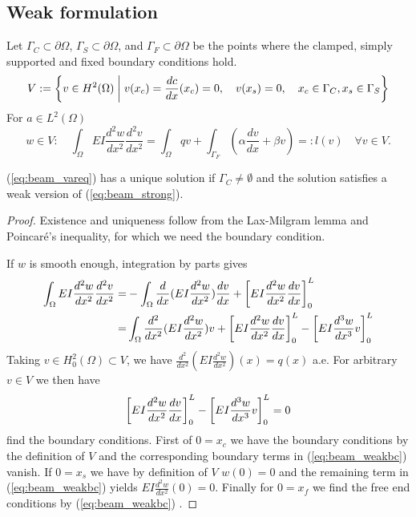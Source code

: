\subsection{Weak formulation}\label{subsec:}
%
%
Let $\Gamma_C\subset\partial\Omega$, $\Gamma_S\subset\partial\Omega$, and $\Gamma_F\subset\partial\Omega$ be the points where the clamped, simply supported and fixed boundary conditions hold.
%
\begin{equation}\label{eq:beam_V}
V:= \left\{v\in H^2(\Omega)\;\middle|\;v(x_c)=\frac{d c}{dx}(x_c)=0, \quad v(x_s)=0,\quad x_c\in\Gamma_C,x_s\in\Gamma_S\right\}
\end{equation}
%
For $a\in L^2(\Omega)$
%
\begin{equation}\label{eq:beam_vareq}
w\in V:\quad \int_{\Omega} EI \frac{d^2 w}{dx^2}\frac{d^2 v}{dx^2}= \int_{\Omega} qv 
+ \int_{\Gamma_F} (\alpha \frac{d v}{dx}+ \beta v)=:l(v)\quad \forall v\in V.
\end{equation}
%
\begin{lemma}\label{lemma:}
(\ref{eq:beam_vareq}) has a unique solution if $\Gamma_C\ne\emptyset$ and the solution satisfies a weak version of 
(\ref{eq:beam_strong}).
\end{lemma}
%
\begin{proof}
Existence and uniqueness follow from the Lax-Milgram lemma and Poincaré's inequality, for which we need the boundary condition.

If $w$ is smooth enough, integration by parts gives
%
\begin{align*}
\int_{\Omega} EI \frac{d^2 w}{dx^2}\frac{d^2 v}{dx^2}=&-\int_{\Omega}  \frac{d}{dx}(EI \frac{d^2 w}{dx^2})\frac{d v}{dx} + \left[{EI\frac{d^2 w}{dx^2}\frac{d v}{dx}}\right]_{0}^{L}\\
=& \int_{\Omega} \frac{d^2}{dx^2}(EI \frac{d^2 w}{dx^2})v + \left[{EI\frac{d^2 w}{dx^2}\frac{d v}{dx}}\right]_{0}^{L}- \left[{EI\frac{d^3 w}{dx^3}v}\right]_{0}^{L}
\end{align*}
%
Taking $v\in H^2_0(\Omega)\subset V$, we have $\frac{d^2}{dx^2} (EI \frac{d^2 w}{dx^2})(x) = q(x)$ a.e. For arbitrary $v\in V$ we 
then have
%
\begin{equation}\label{eq:beam_weakbc}
\left[{EI\frac{d^2 w}{dx^2}\frac{d v}{dx}}\right]_{0}^{L}- \left[{EI\frac{d^3 w}{dx^3}v}\right]_{0}^{L}=0
\end{equation}
% 
find the boundary conditions. 
First of $0=x_c$ we have the boundary conditions by the definition of $V$ and the corresponding boundary terms in (\ref{eq:beam_weakbc}) vanish. If $0=x_s$ we have by definition of $V$ $w(0)=0$ and the remaining term in (\ref{eq:beam_weakbc}) yields $EI\frac{d^2 w}{dx^2}(0)=0$. Finally for $0=x_f$ we find the free end conditions by (\ref{eq:beam_weakbc}) .
\end{proof}
%
%
